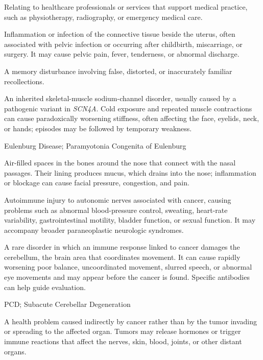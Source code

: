  Relating to healthcare professionals or services that support medical practice, such as physiotherapy, radiography, or emergency medical care.

 Inflammation or infection of the connective tissue beside the uterus, often associated with pelvic infection or occurring after childbirth, miscarriage, or surgery. It may cause pelvic pain, fever, tenderness, or abnormal discharge.

 A memory disturbance involving false, distorted, or inaccurately familiar recollections.

 An inherited skeletal-muscle sodium-channel disorder, usually caused by a pathogenic variant in \textit{SCN4A}. Cold exposure and repeated muscle contractions can cause paradoxically worsening stiffness, often affecting the face, eyelids, neck, or hands; episodes may be followed by temporary weakness.

\synonyms
Eulenburg Disease; Paramyotonia Congenita of Eulenburg

 Air-filled spaces in the bones around the nose that connect with the nasal passages. Their lining produces mucus, which drains into the nose; inflammation or blockage can cause facial pressure, congestion, and pain.

 Autoimmune injury to autonomic nerves associated with cancer, causing problems such as abnormal blood-pressure control, sweating, heart-rate variability, gastrointestinal motility, bladder function, or sexual function. It may accompany broader paraneoplastic neurologic syndromes.

 A rare disorder in which an immune response linked to cancer damages the cerebellum, the brain area that coordinates movement. It can cause rapidly worsening poor balance, uncoordinated movement, slurred speech, or abnormal eye movements and may appear before the cancer is found. Specific antibodies can help guide evaluation.

\synonyms
PCD; Subacute Cerebellar Degeneration

 A health problem caused indirectly by cancer rather than by the tumor invading or spreading to the affected organ. Tumors may release hormones or trigger immune reactions that affect the nerves, skin, blood, joints, or other distant organs.

